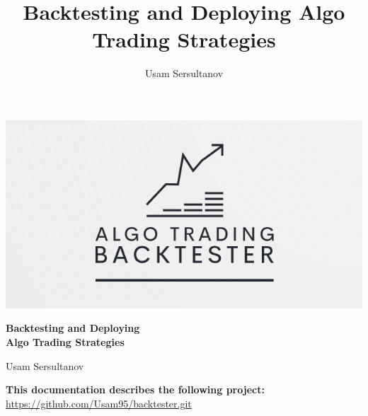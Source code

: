 \documentclass[12pt, a4paper]{report} %
\title{Backtesting and Deploying Algo Trading Strategies}
\author{Usam Sersultanov}
\begin{document}
\begin{titlepage}
    \centering

	\vspace*{-2cm} %
    \includegraphics[scale=1, width=\textwidth, keepaspectratio]{./imgs/logo8.png}
	\vspace*{2.5cm}

    {\Huge \bfseries Backtesting and Deploying \\
    Algo Trading Strategies\par}
    \vspace{1cm}
	
    {\Large Usam Sersultanov\par}
    \vspace{9.5cm}

    {\normalsize \textbf{This documentation describes the following project:}} \\
    \vspace{0.2cm}
    \href{https://github.com/Usam95/backtester.git}{https://github.com/Usam95/backtester.git}



\end{titlepage}
\end{document}
